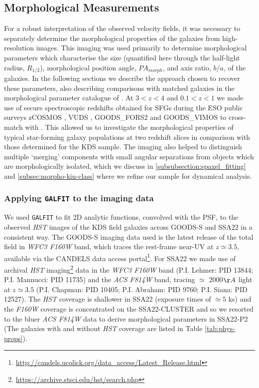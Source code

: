 \documentclass[fleqn,usenatbib]{mnras}
\begin{document}
\subsection{Morphological Measurements}\label{subsec:morphological_measurements}
For a robust interpretation of the observed velocity fields, it was necessary to separately determine the morphological properties of the galaxies from high-resolution images.
This imaging was used primarily to determine morphological parameters which characterise the size (quantified here through the half-light radius, $R_{1/2}$), morphological position angle, $PA_{morph}$, and axis ratio, $b/a$, of the galaxies. 
In the following sections we describe the approach chosen to recover these parameters, also describing comparisons with matched galaxies in the morphological parameter catalogue of \cite{VanderWel2012}.
At $3 < z < 4$ and $0.1 < z < 1$ we made use of secure spectroscopic redshifts obtained for SFGs during the ESO public surveys zCOSMOS \citep{Lilly2007}, VUDS \citep{Tasca2016}, GOODS\_FORS2 \citep{Vanzella2005,Vanzella2006,Vanzella2008} and GOODS\_VIMOS \citep{Balestra2010} to cross-match with \cite{VanderWel2012}.
This allowed us to investigate the morphological properties of typical star-forming galaxy populations at two redshift slices in comparison with those determined for the KDS sample.
The imaging also helped to distinguish multiple `merging' components with small angular separations from objects which are morphologically isolated, which we discuss in \cref{subsubsection:spaxel_fitting} and \cref{subsec:morpho-kin-class} where we refine our sample for dynamical analysis.

\subsubsection{Applying {\tt GALFIT} to the imaging data}\label{subsubsec:galfitting}
We used {\tt GALFIT} \citep{Peng2010_galfit} to fit 2D analytic functions, convolved with the PSF, to the observed {\em HST} images of the KDS field galaxies across GOODS-S and SSA22 in a consistent way.
The GOODS-S imaging data used is the latest release of the total field in {\it WFC3 F160W} band, which traces the rest-frame near-UV at $z\simeq3.5$, available via the CANDELS \citep{Grogin2011,Koekemoer2011} data access portal\footnote{\url{http://candels.ucolick.org/data_access/Latest_Release.html}}.
For SSA22 we made use of archival {\em HST} imaging\footnote{\url{https://archive.stsci.edu/hst/search.php}} data in the {\it WFC3 F160W} band (P.I. Lehmer: PID 13844; P.I. Mannucci: PID 11735) and the {\it ACS F814W} band, tracing $\simeq$ 2000$\AA$ light at $z\simeq3.5$ (P.I. Chapman: PID 10405; P.I. Abraham: PID 9760; P.I. Siana: PID 12527).
The {\em HST} coverage is shallower in SSA22 (exposure times of $\simeq5$ ks) and the {\it F160W} coverage is concentrated on the SSA22-CLUSTER and so we resorted to the bluer {\it ACS F814W} data to derive morphological parameters in SSA22-P2 (The galaxies with and without {\em HST} coverage are listed in Table \ref{tab:phys-props}). \\
\end{document}
